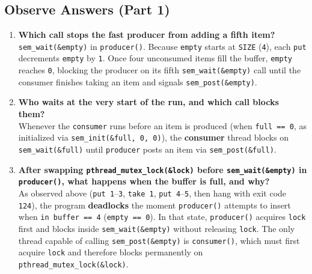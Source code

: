 \documentclass[12pt,a4paper]{article}
\begin{document}
\subsection{Observe Answers (Part 1)}
\begin{enumerate}
    \item \textbf{Which call stops the fast producer from adding a fifth item?} \\
    \texttt{sem\_\allowbreak wait(\&empty)} in \texttt{producer()}. Because \texttt{empty} starts at \texttt{SIZE} (\texttt{4}), each \texttt{put} decrements \texttt{empty} by \texttt{1}. Once four unconsumed items fill the buffer, \texttt{empty} reaches \texttt{0}, blocking the producer on its fifth \texttt{sem\_\allowbreak wait(\&empty)} call until the consumer finishes taking an item and signals \texttt{sem\_\allowbreak post(\&empty)}.

    \item \textbf{Who waits at the very start of the run, and which call blocks them?} \\
    Whenever the \texttt{consumer} runs before an item is produced (when \texttt{full == 0}, as initialized via \texttt{sem\_\allowbreak init(\&full, 0, 0)}), the \textbf{consumer} thread blocks on \texttt{sem\_\allowbreak wait(\&full)} until \texttt{producer} posts an item via \texttt{sem\_\allowbreak post(\&full)}.

    \item \textbf{After swapping \texttt{pthread\_\allowbreak mutex\_\allowbreak lock(\&lock)} before \texttt{sem\_\allowbreak wait(\&empty)} in \texttt{producer()}, what happens when the buffer is full, and why?} \\
    As observed above (\texttt{put 1}--\texttt{3}, \texttt{take 1}, \texttt{put 4}--\texttt{5}, then hang with exit code \texttt{124}), the program \textbf{deadlocks} the moment \texttt{producer()} attempts to insert when \texttt{in buffer == 4} (\texttt{empty == 0}). In that state, \texttt{producer()} acquires \texttt{lock} first and blocks inside \texttt{sem\_\allowbreak wait(\&empty)} without releasing \texttt{lock}. The only thread capable of calling \texttt{sem\_\allowbreak post(\&empty)} is \texttt{consumer()}, which must first acquire \texttt{lock} and therefore blocks permanently on \texttt{pthread\_\allowbreak mutex\_\allowbreak lock(\&lock)}.
\end{enumerate}

\end{document}

